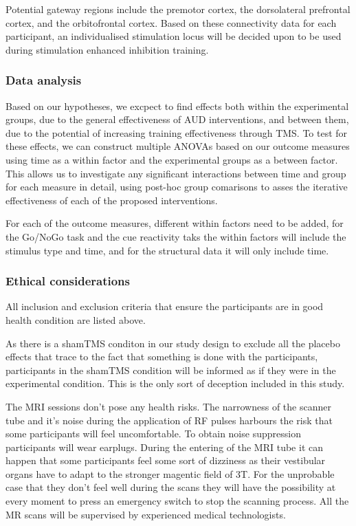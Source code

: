 \documentclass[12pt]{article}
\begin{document}
Potential gateway regions include the premotor cortex, the dorsolateral prefrontal cortex, and the orbitofrontal cortex. Based on these connectivity data for each participant, an individualised stimulation locus will be decided upon to be used during stimulation enhanced inhibition training.

\subsubsection{Data analysis}

Based on our hypotheses, we excpect to find effects both within the experimental groups, due to the general effectiveness of AUD interventions, and between them, due to the potential of increasing training effectiveness through TMS. To test for these effects, we can construct multiple ANOVAs based on our outcome measures using time as a within factor and the experimental groups as a between factor. This allows us to investigate any significant interactions between time and group for each measure in detail, using post-hoc group comarisons to asses the iterative effectiveness of each of the proposed interventions.

For each of the outcome measures, different within factors need to be added, for the Go/NoGo task and the cue reactivity taks the within factors will include the stimulus type and time, and for the structural data it will only include time.

\subsubsection{Ethical considerations}
All inclusion and exclusion criteria that ensure the participants are in good health condition are listed above.

As there is a shamTMS conditon in our study design to exclude all the placebo effects that trace to the fact that something is done with the participants, participants in the shamTMS condition will be informed as if they were in the experimental condition. This is the only sort of deception included in this study. 

The MRI sessions don't pose any health risks. The narrowness of the scanner tube and it's noise during the application of RF pulses harbours the risk that some participants will feel uncomfortable. To obtain noise suppression participants will wear earplugs. During the entering of the MRI tube it can happen that some participants feel some sort of dizziness as their vestibular organs have to adapt to the stronger magentic field of 3T. For the unprobable case that they don't feel well during the scans they will have the possibility at every moment to press an emergency switch to stop the scanning process. All the MR scans will be supervised by experienced medical technologists. 
\end{document}
